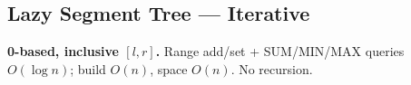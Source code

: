 \documentclass[9pt,a4paper]{extarticle}
\begin{document}
\newcommand{\lazyhead}[1]{%
  \par\vspace{5pt}\noindent
  {\bfseries\fontsize{9.6}{11.62}\selectfont #1}%
  \par\vspace{1pt}\hrule\vspace{3pt}
}
\newcommand{\lazycode}[1]{%
  {\ttfamily\fontsize{7.45}{8.72}\selectfont\detokenize{#1}}%
}
\newcommand{\lazypattern}[3]{%
  {\bfseries #1}\par
  {\fontsize{8.7}{10.12}\selectfont
  \textbf{Problem:} #2\par
  \textbf{Approach:} #3\par}\vspace{3pt}
}

\subsection{Lazy Segment Tree --- Iterative}
\vspace{2pt}
{\small\textbf{0-based, inclusive $[l,r]$.}
Range add/set + SUM/MIN/MAX queries $O(\log n)$;
build $O(n)$, space $O(n)$. No recursion.}
\par\vspace{4pt}
\noindent
\end{document}
